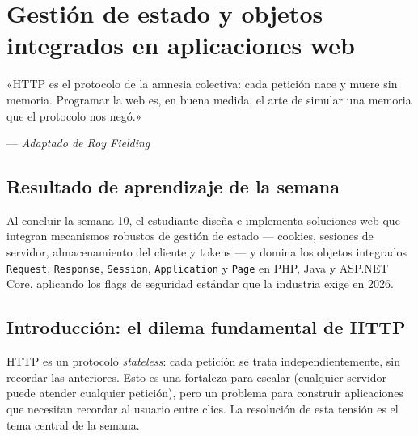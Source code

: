 \documentclass[11pt,a4paper,openany]{book}
\begin{document}
\setcounter{chapter}{9}

\chapter{Gestión de estado y objetos integrados en aplicaciones web}
\label{cap:semana10}

\epigraph{«HTTP es el protocolo de la amnesia colectiva: cada petición
nace y muere sin memoria. Programar la web es, en buena medida, el arte
de simular una memoria que el protocolo nos negó.»}{--- \textit{Adaptado
de Roy Fielding}}

\section*{Resultado de aprendizaje de la semana}
Al concluir la semana 10, el estudiante diseña e implementa soluciones
web que integran mecanismos robustos de gestión de estado --- cookies,
sesiones de servidor, almacenamiento del cliente y tokens --- y domina
los objetos integrados \texttt{Request}, \texttt{Response},
\texttt{Session}, \texttt{Application} y \texttt{Page} en PHP, Java y
ASP.NET Core, aplicando los flags de seguridad estándar que la
industria exige en 2026.

\section{Introducción: el dilema fundamental de HTTP}

HTTP es un protocolo \emph{stateless}: cada petición se
trata independientemente, sin recordar las anteriores. Esto es una
fortaleza para escalar (cualquier servidor puede atender cualquier
petición), pero un problema para construir aplicaciones que necesitan
recordar al usuario entre clics. La resolución de esta tensión es el
tema central de la semana.
\end{document}
